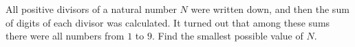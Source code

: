All positive divisors of a natural number $N$ were written down, and then the sum of digits of each divisor was calculated. It turned out that among these sums there were all numbers from $1$ to $9$. Find the smallest possible value of $N$.
